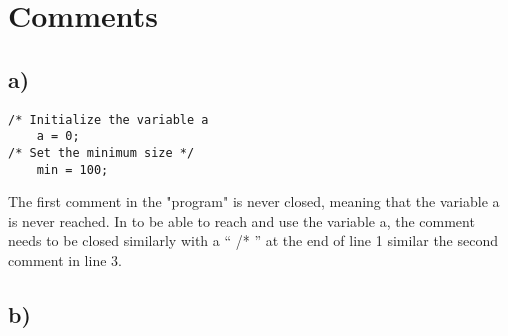\section{Comments}

\subsection{a)}

\begin{verbatim}
/* Initialize the variable a
    a = 0;
/* Set the minimum size */
    min = 100;
\end{verbatim}

The first comment in the "program" is never closed, meaning
that the variable a is never reached. In to be able to reach and use the variable
a, the comment needs to be closed similarly with a `` /* '' at the end of line 1
similar the second comment in line 3.

\subsection{b)}